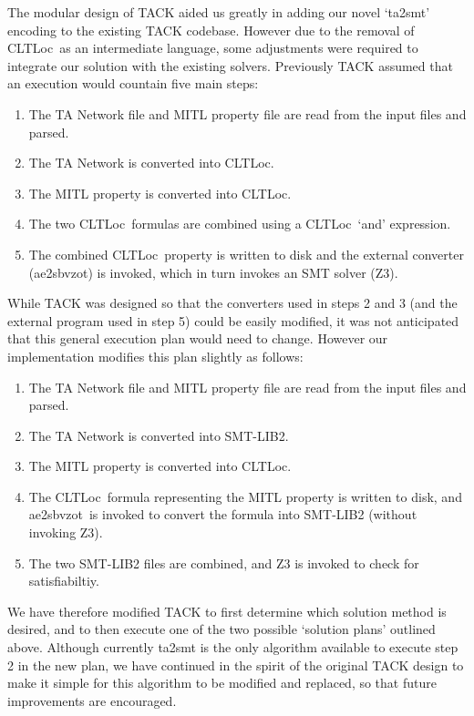 \documentclass[a4paper,11pt]{report}
\theoremstyle{definition}
\newcommand{\cltloc}{CLTLoc}
\newcommand{\aez}{ae2sbvzot}
\begin{document}
The modular design of TACK aided us greatly in adding our novel `ta2smt'
encoding to the existing TACK codebase. However due to the removal of \cltloc\
as an intermediate language, some adjustments were required to integrate our
solution with the existing solvers. Previously TACK assumed that an execution
would countain five main steps:
\begin{enumerate}
  \item The TA Network file and MITL property file are read from the input
  files and parsed.
  \item The TA Network is converted into \cltloc.
  \item The MITL property is converted into \cltloc.
  \item The two \cltloc\ formulas are combined using a \cltloc\ `and'
  expression.
  \item The combined \cltloc\ property is written to disk and the external
    converter (\aez) is invoked, which in turn invokes an SMT solver (Z3).
\end{enumerate}
While TACK was designed so that the converters used in steps 2 and 3 (and the
external program used in step 5) could be easily modified, it was not
anticipated that this general execution plan would need to change. However our
implementation modifies this plan slightly as follows:
\begin{enumerate}
  \item The TA Network file and MITL property file are read from the input
    files and parsed.
  \item The TA Network is converted into SMT-LIB2.
  \item The MITL property is converted into \cltloc.
  \item The \cltloc\ formula representing the MITL property is written to disk,
    and \aez\ is invoked to convert the formula into SMT-LIB2 (without invoking
    Z3).
  \item The two SMT-LIB2 files are combined, and Z3 is invoked to check for
    satisfiabiltiy.
\end{enumerate}
We have therefore modified TACK to first determine which solution method is
desired, and to then execute one of the two possible `solution plans' outlined
above. Although currently ta2smt is the only algorithm available to execute step
2 in the new plan, we have continued in the spirit of the original TACK design
to make it simple for this algorithm to be modified and replaced, so that future
improvements are encouraged.
\end{document}

